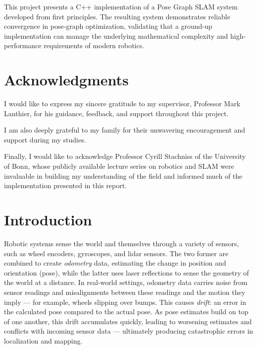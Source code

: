 \documentclass[12pt]{report}
\begin{document}
This project presents a C++ implementation of a Pose Graph SLAM system developed from first
principles.
The resulting system demonstrates reliable convergence in pose-graph optimization, validating
that a ground-up implementation can manage the underlying mathematical complexity and
high-performance requirements of modern robotics.

\newpage

\chapter*{Acknowledgments}

I would like to express my sincere gratitude to my supervisor, Professor Mark Lanthier, for his
guidance, feedback, and support throughout this project.

I am also deeply grateful to my family for their unwavering encouragement and support during my
studies.

Finally, I would like to acknowledge Professor Cyrill Stachniss of the University of Bonn, whose
publicly available lecture series on robotics and SLAM were invaluable in building my understanding
of the field and informed much of the implementation presented in this report.

\newpage

{\pagestyle{plain}\tableofcontents}
\newpage

\listoffigures
\newpage


\setcounter{page}{1}

\chapter{Introduction}

Robotic systems sense the world and themselves through a variety of sensors, such as wheel encoders,
gyroscopes, and lidar sensors.
The two former are combined to create \textit{odometry} data, estimating the change in position and
orientation (pose), while the latter uses laser reflections to sense the geometry of the world at a
distance.
In real-world settings, odometry data carries noise from sensor readings and misalignments between
these readings and the motion they imply --- for example, wheels slipping over bumps.
This causes \textit{drift}: an error in the calculated pose compared to the actual pose.
As pose estimates build on top of one another, this drift accumulates quickly, leading to worsening
estimates and conflicts with incoming sensor data --- ultimately producing catastrophic errors in
localization and mapping.
\end{document}
